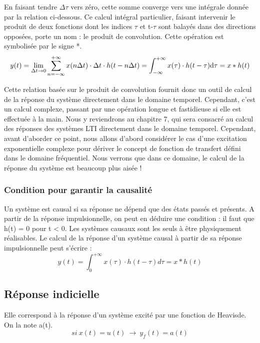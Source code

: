 	En faisant tendre $ \Delta \tau $ vers zéro, cette somme converge vers une intégrale
	donnée par la relation ci-dessous. Ce calcul intégral particulier,
	faisant intervenir le produit de deux fonctions dont les indices $\tau $ et
	t-$\tau $ sont balayés dans des directions opposées, porte un nom : le produit
	de convolution. Cette opération est symbolisée par le signe *.
	\begin{equation}\label{Demo_produit_convolution}
	y(t) = \lim_{\Delta t \to 0} \sum_{n=-\infty}^{+\infty} x(n\Delta t) \cdot \Delta t \cdot h(t-n\Delta t) = \int_{-\infty}^{+\infty} x(\tau) \cdot h(t-\tau) \mathrm{d} \tau = x*h(t)
	\end{equation}
	
	Cette relation basée sur le produit de convolution fournit donc un outil de calcul de la réponse du système directement dans le domaine temporel. Cependant, c'est un calcul complexe, passant par une opération longue et fastidieuse si elle est effectuée à la main. Nous y reviendrons au chapitre 7, qui sera consacré au calcul des réponses des systèmes LTI directement dans le domaine temporel. Cependant, avant d'aborder ce point, nous allons d'abord considérer le cas d'une excitation exponentielle complexe pour dériver le concept de fonction de transfert défini dans le domaine fréquentiel. Nous verrons que dans ce domaine, le calcul de la réponse du système est beaucoup plus aisée !
	
	\subsubsection{Condition pour garantir la causalité}
	Un système est causal si sa réponse ne dépend que des états passés et présents. A partir de la réponse impulsionnelle, on peut en déduire une condition : il faut que h(t) = 0 pour t < 0. Les systèmes causaux sont les seuls à être physiquement réalisables. Le calcul de la réponse d'un système causal à partir de sa réponse impulsionnelle peut s'écrire :
	\begin{equation}\label{}
	y(t) = \int_{0}^{+ \infty} x(\tau) \cdot h(t-\tau)d\tau = x*h(t)
	\end{equation}
	\vspace{1\baselineskip}	
	
	\subsection{Réponse indicielle}
	Elle correspond à la réponse d'un système excité par une fonction de Heavisde. On la note a(t).
	\begin{equation}\label{key}
	si~x(t)=u(t)~\rightarrow ~y_{f}(t)=a(t)
	\end{equation}

